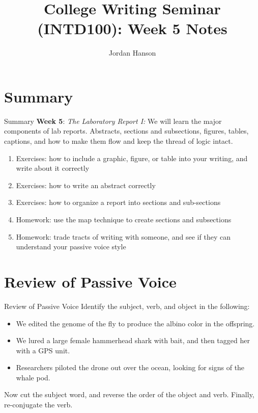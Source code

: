 \documentclass{beamer}
\title{College Writing Seminar (INTD100): Week 5 Notes}
\author{Jordan Hanson}
\institute{Whittier College Department of Physics and Astronomy}
\begin{document}
\maketitle

\section{Summary}

\begin{frame}{Summary}
\small
\textbf{Week 5}: \textit{The Laboratory Report I:} We will learn the major components of lab reports.  Abstracts, sections and subsections, figures, tables, captions, and how to make them flow and keep the thread of logic intact.
\begin{enumerate}
\item Exercises: how to include a graphic, figure, or table into your writing, and write about it correctly
\item Exercises: how to write an abstract correctly
\item Exercises: how to organize a report into sections and sub-sections
\item Homework: use the map technique to create sections and subsections
\item Homework: trade tracts of writing with someone, and see if they can understand your passive voice style
\end{enumerate}
\end{frame}

\section{Review of Passive Voice}

\begin{frame}{Review of Passive Voice}
Identify the subject, verb, and object in the following:
\begin{itemize}
\item We edited the genome of the fly to produce the albino color in the offspring.
\item We lured a large female hammerhead shark with bait, and then tagged her with a GPS unit.
\item Researchers piloted the drone out over the ocean, looking for signs of the whale pod.
\end{itemize}
Now cut the subject word, and reverse the order of the object and verb.  Finally, re-conjugate the verb.
\end{frame}
\end{document}
